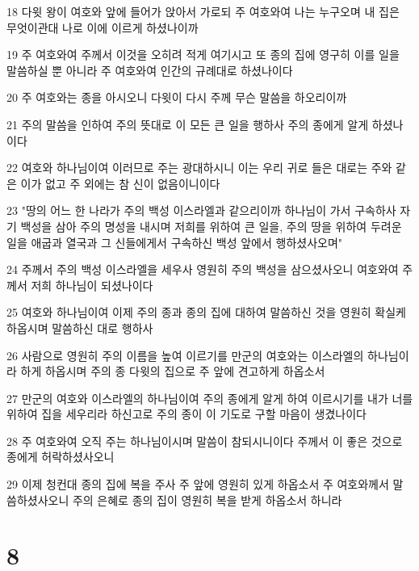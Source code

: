 \par 18 다윗 왕이 여호와 앞에 들어가 앉아서 가로되 주 여호와여 나는 누구오며 내 집은 무엇이관대 나로 이에 이르게 하셨나이까
\par 19 주 여호와여 주께서 이것을 오히려 적게 여기시고 또 종의 집에 영구히 이를 일을 말씀하실 뿐 아니라 주 여호와여 인간의 규례대로 하셨나이다
\par 20 주 여호와는 종을 아시오니 다윗이 다시 주께 무슨 말씀을 하오리이까
\par 21 주의 말씀을 인하여 주의 뜻대로 이 모든 큰 일을 행하사 주의 종에게 알게 하셨나이다
\par 22 여호와 하나님이여 이러므로 주는 광대하시니 이는 우리 귀로 들은 대로는 주와 같은 이가 없고 주 외에는 참 신이 없음이니이다
\par 23 "땅의 어느 한 나라가 주의 백성 이스라엘과 같으리이까 하나님이 가서 구속하사 자기 백성을 삼아 주의 명성을 내시며 저희를 위하여 큰 일을, 주의 땅을 위하여 두려운 일을 애굽과 열국과 그 신들에게서 구속하신 백성 앞에서 행하셨사오며"
\par 24 주께서 주의 백성 이스라엘을 세우사 영원히 주의 백성을 삼으셨사오니 여호와여 주께서 저희 하나님이 되셨나이다
\par 25 여호와 하나님이여 이제 주의 종과 종의 집에 대하여 말씀하신 것을 영원히 확실케 하옵시며 말씀하신 대로 행하사
\par 26 사람으로 영원히 주의 이름을 높여 이르기를 만군의 여호와는 이스라엘의 하나님이라 하게 하옵시며 주의 종 다윗의 집으로 주 앞에 견고하게 하옵소서
\par 27 만군의 여호와 이스라엘의 하나님이여 주의 종에게 알게 하여 이르시기를 내가 너를 위하여 집을 세우리라 하신고로 주의 종이 이 기도로 구할 마음이 생겼나이다
\par 28 주 여호와여 오직 주는 하나님이시며 말씀이 참되시니이다 주께서 이 좋은 것으로 종에게 허락하셨사오니
\par 29 이제 청컨대 종의 집에 복을 주사 주 앞에 영원히 있게 하옵소서 주 여호와께서 말씀하셨사오니 주의 은혜로 종의 집이 영원히 복을 받게 하옵소서 하니라

\chapter{8}

